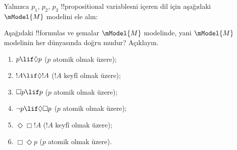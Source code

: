 \documentclass[../../../include/open-logic-section]{subfiles}
\begin{document}
\begin{prob}
  Yalnızca $p_1$, $p_2$, $p_3$ !!{propositional variable}s{}ni içeren dil
  için aşağıdaki $\mModel{M}$ modelini ele alın:
  \begin{center}
  \end{center}
  Aşağıdaki !!{formula}s ve şemalar $\mModel{M}$ modelinde, yani
  $\mModel{M}$ modelinin her dünyasında doğru mudur? Açıklayın.
  \begin{enumerate}
  \item $p\lif \Diamond p$ ($p$ atomik olmak üzere);
  \item $!A\lif \Diamond !A$ ($!A$ keyfî olmak üzere);
  \item $\Box p \lif p$ ($p$ atomik olmak üzere);
  \item $\lnot p \lif \Diamond \Box p$ ($p$ atomik olmak üzere);
  \item $\Diamond \Box !A$ ($!A$ keyfî olmak üzere);
  \item $\Box \Diamond p$ ($p$ atomik olmak üzere).
  \end{enumerate}
\end{prob}
\end{document}
